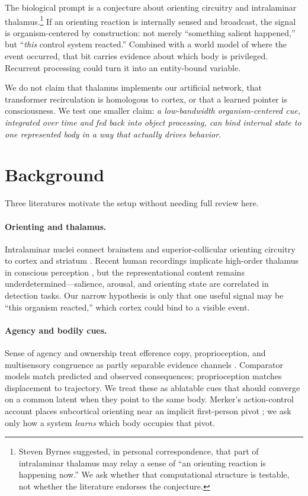 \documentclass[11pt]{article}
\begin{document}
The biological prompt is a conjecture about orienting circuitry and intralaminar thalamus.\footnote{Steven Byrnes suggested, in personal correspondence, that part of intralaminar thalamus may relay a sense of ``an orienting reaction is happening now.'' We ask whether that computational structure is testable, not whether the literature endorses the conjecture.} If an orienting reaction is internally sensed and broadcast, the signal is organism-centered by construction: not merely ``something salient happened,'' but ``\emph{this} control system reacted.'' Combined with a world model of where the event occurred, that bit carries evidence about which body is privileged. Recurrent processing could turn it into an entity-bound variable.

We do not claim that thalamus implements our artificial network, that transformer recirculation is homologous to cortex, or that a learned pointer is consciousness. We test one smaller claim: \emph{a low-bandwidth organism-centered cue, integrated over time and fed back into object processing, can bind internal state to one represented body in a way that actually drives behavior.}

\section{Background}

Three literatures motivate the setup without needing full review here.

\paragraph{Orienting and thalamus.}
Intralaminar nuclei connect brainstem and superior-collicular orienting circuitry to cortex and striatum \citep{grunwerg1992,krout2001,fisher2014,kumar2023}. Recent human recordings implicate high-order thalamus in conscious perception \citep{fang2025}, but the representational content remains underdetermined---salience, arousal, and orienting state are correlated in detection tasks. Our narrow hypothesis is only that one useful signal may be ``this organism reacted,'' which cortex could bind to a visible event.

\paragraph{Agency and bodily cues.}
Sense of agency and ownership treat efference copy, proprioception, and multisensory congruence as partly separable evidence channels \citep{braun2018}. Comparator models match predicted and observed consequences; proprioception matches displacement to trajectory. We treat these as ablatable cues that should converge on a common latent when they point to the same body. Merker's action-control account places subcortical orienting near an implicit first-person pivot \citep{merker2013}; we ask only how a system \emph{learns} which body occupies that pivot.
\end{document}
